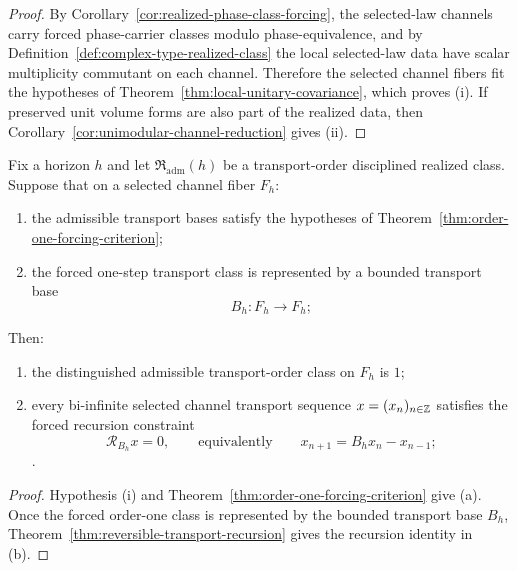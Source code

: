 \begin{proof}
By Corollary~\ref{cor:realized-phase-class-forcing}, the selected-law channels
carry forced phase-carrier classes modulo phase-equivalence, and by
Definition~\ref{def:complex-type-realized-class} the local selected-law data
have scalar multiplicity commutant on each channel. Therefore the selected
channel fibers fit the hypotheses of
Theorem~\ref{thm:local-unitary-covariance}, which proves (i). If preserved unit
volume forms are also part of the realized data, then
Corollary~\ref{cor:unimodular-channel-reduction} gives (ii).
\end{proof}

\begin{corollary}
\label{cor:realized-reversible-recursion-forcing}
Fix a horizon $h$ and let $\mathfrak R_{\mathrm{adm}}(h)$ be a transport-order
disciplined realized class. Suppose that on a selected channel fiber $F_h$:
\begin{enumerate}[label=(\roman*), leftmargin=2em, itemsep=0.2em]
\item the admissible transport bases satisfy the hypotheses of
      Theorem~\ref{thm:order-one-forcing-criterion};
\item the forced one-step transport class is represented by a bounded transport
      base
      \[
      B_h:F_h\to F_h;
      \]
\end{enumerate}
Then:
\begin{enumerate}[label=(\alph*), leftmargin=2em, itemsep=0.2em]
\item the distinguished admissible transport-order class on $F_h$ is $1$;
\item every bi-infinite selected channel transport sequence
      $x=(x_n)_{n\in\mathbb{Z}}$ satisfies the forced recursion constraint
      \[
      \mathcal R_{B_h}x=0,
      \qquad\text{equivalently}\qquad
      x_{n+1}=B_hx_n-x_{n-1};
      \].
\end{enumerate}
\end{corollary}

\begin{proof}
Hypothesis (i) and Theorem~\ref{thm:order-one-forcing-criterion} give (a). Once
the forced order-one class is represented by the bounded transport base $B_h$,
Theorem~\ref{thm:reversible-transport-recursion} gives the recursion identity
in (b).
\end{proof}

